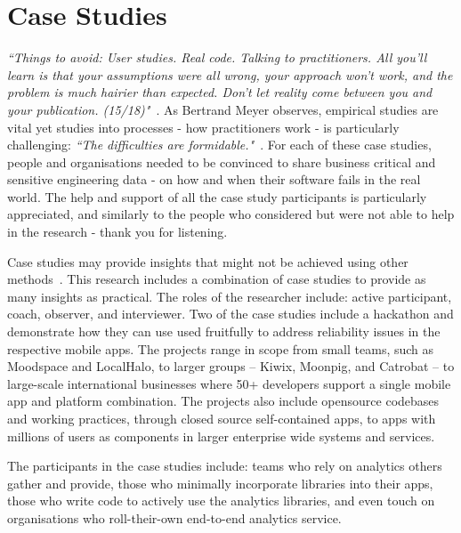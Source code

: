 \chapter{Case Studies}
\label{chapter-case-studies}

\emph{``Things to avoid: User studies. Real code. Talking to practitioners. All you'll learn is that your assumptions were all wrong, your approach won't work, and the problem is much hairier than expected. Don't let reality come between you and your publication. (15/18)"}~\citep{zeller2021_tweet_the_devils_guide_to_incremental_research_15_18}. As Bertrand Meyer observes, empirical studies are vital yet studies into processes - how practitioners work - is particularly challenging: \emph{``The difficulties are formidable."}~\citep{meyer2018_towards_empirical_answers_to_important_engineering_questions}. For each of these case studies, people and organisations needed to be convinced to share business critical and sensitive engineering data - on how and when their software fails in the real world. The help and support of all the case study participants is particularly appreciated, and similarly to the people who considered but were not able to help in the research - thank you for listening.

Case studies may provide insights that might not be achieved using other methods~\citep{rowley2002_using_case_studies_in_research}. This research includes a combination of case studies to provide as many insights as practical. The roles of the researcher include: active participant, coach, observer, and interviewer. Two of the case studies include a hackathon and demonstrate how they can use used fruitfully to address reliability issues in the respective mobile apps. The projects range in scope from small teams, such as Moodspace and LocalHalo, to larger groups -- Kiwix, Moonpig, and Catrobat -- to large-scale international businesses where 50+ developers support a single mobile app and platform combination. The projects also include opensource codebases and working practices, through closed source self-contained apps, to apps with millions of users as components in larger enterprise wide systems and services. 

%

The participants in the case studies include: teams who rely on analytics others gather and provide, those who minimally incorporate libraries into their apps, those who write code to actively use the analytics libraries, and even touch on organisations who roll-their-own end-to-end analytics service.

